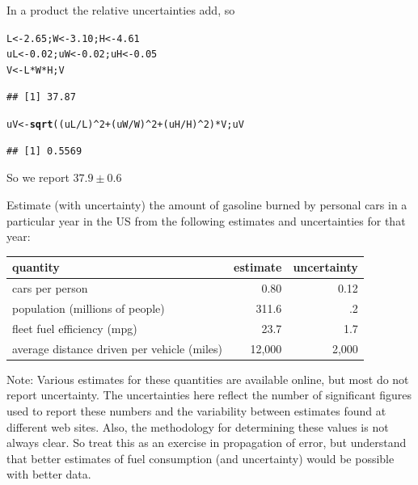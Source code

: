 \documentclass[twoside]{book}\usepackage[]{graphicx}\usepackage[]{xcolor}
\makeatletter
\newcommand{\hlnum}[1]{\textcolor[rgb]{0.686,0.059,0.569}{#1}}%
\newcommand{\hlopt}[1]{\textcolor[rgb]{0,0,0}{#1}}%
\newcommand{\hlstd}[1]{\textcolor[rgb]{0.345,0.345,0.345}{#1}}%
\newcommand{\hlkwb}[1]{\textcolor[rgb]{0.69,0.353,0.396}{#1}}%
\newcommand{\hlkwd}[1]{\textcolor[rgb]{0.737,0.353,0.396}{\textbf{#1}}}%
\newenvironment{kframe}{%
 \def\at@end@of@kframe{}%
 \ifinner\ifhmode%
  \def\at@end@of@kframe{\end{minipage}}%
  \begin{minipage}{\columnwidth}%
 \fi\fi%
 \def\FrameCommand##1{\hskip\@totalleftmargin \hskip-\fboxsep
 \colorbox{shadecolor}{##1}\hskip-\fboxsep
     \hskip-\linewidth \hskip-\@totalleftmargin \hskip\columnwidth}%
 \MakeFramed {\advance\hsize-\width
   \@totalleftmargin\z@ \linewidth\hsize
   \@setminipage}}%
 {\par\unskip\endMakeFramed%
 \at@end@of@kframe}
\newenvironment{knitrout}{}{} %
\makeatother
\begin{document}
\begin{solution}
	In a product the relative uncertainties add, so
\begin{knitrout}
\color{fgcolor}\begin{kframe}
\begin{alltt}
\hlstd{L} \hlkwb{<-} \hlnum{2.65}\hlstd{; W} \hlkwb{<-} \hlnum{3.10}\hlstd{; H} \hlkwb{<-} \hlnum{4.61}
\hlstd{uL} \hlkwb{<-} \hlnum{0.02}\hlstd{; uW} \hlkwb{<-} \hlnum{0.02}\hlstd{; uH} \hlkwb{<-} \hlnum{0.05}
\hlstd{V} \hlkwb{<-} \hlstd{L} \hlopt{*} \hlstd{W} \hlopt{*} \hlstd{H; V}
\end{alltt}
\begin{verbatim}
## [1] 37.87
\end{verbatim}
\begin{alltt}
\hlstd{uV} \hlkwb{<-} \hlkwd{sqrt}\hlstd{( (uL}\hlopt{/}\hlstd{L)}\hlopt{^}\hlnum{2} \hlopt{+} \hlstd{(uW}\hlopt{/}\hlstd{W)}\hlopt{^}\hlnum{2} \hlopt{+} \hlstd{(uH}\hlopt{/}\hlstd{H)}\hlopt{^}\hlnum{2}\hlstd{)} \hlopt{*} \hlstd{V; uV}
\end{alltt}
\begin{verbatim}
## [1] 0.5569
\end{verbatim}
\end{kframe}
\end{knitrout}
	So we report $37.9 \pm 0.6$

\end{solution}

\begin{problem}
	Estimate (with uncertainty) 
	the amount of gasoline burned by personal cars in a particular
	year in the US from the following estimates and uncertainties for that
	year:

	\begin{center}
		\begin{tabular}{lrr}
			\hline
			quantity & estimate & uncertainty
			\\
			\hline
			cars per person & 0.80 & 0.12
			\\
			population (millions of people) & 311.6 & .2 
			\\
			fleet fuel efficiency (mpg) & 23.7 & 1.7 
			\\
			average distance driven per vehicle (miles) & 12,000 & 2,000 
			\\
			\hline
		\end{tabular}
	\end{center}

	Note:  Various estimates for these quantities are available online, but 
	most do not report uncertainty.  The uncertainties here reflect the 
	number of significant figures used to report these numbers and the 
	variability between estimates found at different web sites.
	Also, the methodology for determining these values is not always
	clear.  So treat this as an exercise in propagation of error, but 
	understand that better estimates of fuel consumption (and uncertainty)
	would be possible with better data.
\end{problem}
\end{document}
